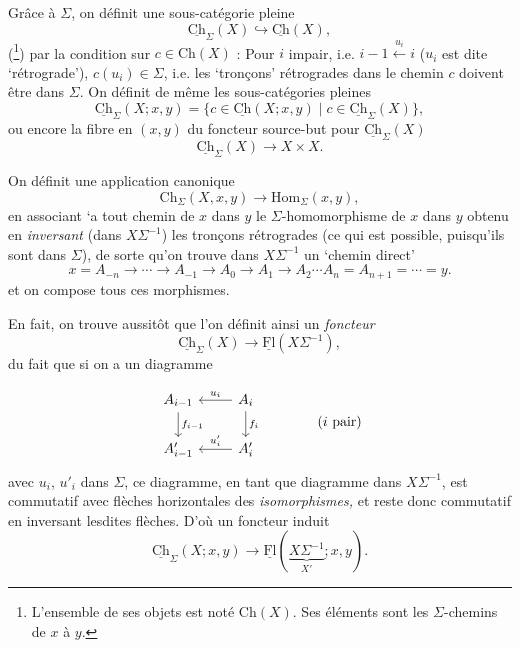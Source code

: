 \documentclass[11pt]{article}
\newcommand{\printedpage}[1]{\marginpar{\footnotesize p.~#1}}
\newcommand{\msp}[1]{\marginpar{\footnotesize [#1]}}
\newcommand{\uCh}{\underline{\mathrm{Ch}}}
\newcommand{\uFl}{\underline{\mathrm{Fl}}}
\newcommand{\Hom}{\mathrm{Hom}}
\begin{document}
Grâce à $\Sigma$, on définit une sous-catégorie pleine
\[
\uCh_\Sigma(X)\hookrightarrow\uCh(X),
\]
(\footnote[3]{L'ensemble de ses objets est noté $\mathrm{Ch}(X)$. Ses éléments sont les $\Sigma$-chemins de $x$ à $y$.}) par la condition sur $c\in\mathrm{Ch}(X)$ : Pour $i$ impair, i.e. $i-1\xleftarrow{u_i}i$ ($u_i$ est dite `rétrograde'), $c(u_i)\in\Sigma$, i.e. les `tronçons' rétrogrades dans le chemin $c$ doivent être dans $\Sigma$. On définit de même les sous-catégories pleines
\[
\uCh_\Sigma(X;x,y)=\{c\in\uCh(X;x,y)\mid c\in\uCh_\Sigma(X)\},
\]
ou encore la fibre en $(x,y)$ du foncteur source-but pour $\uCh_\Sigma(X)$
\[
\uCh_\Sigma(X)\longrightarrow X\times X.
\]

On définit une application canonique
\[
\mathrm{Ch}_\Sigma(X,x,y)\longrightarrow\Hom_\Sigma(x,y),
\]
\msp{page 7}
en associant `a tout chemin de $x$ dans $y$ le $\Sigma$-homomorphisme de $x$ dans $y$ obtenu en \textit{inversant} (dans $X\Sigma^{-1}$) les tronçons rétrogrades (ce qui est possible, puisqu'ils sont dans $\Sigma$), de sorte qu'on trouve dans $X\Sigma^{-1}$ un `chemin direct' %
\[
x=A_{-n}\longrightarrow\cdots\longrightarrow A_{-1}\longrightarrow A_0\longrightarrow A_1\longrightarrow A_2\cdots A_n=A_{n+1}=\cdots=y.
\]
et on compose tous ces morphismes.

En fait, on trouve aussitôt que l'on définit ainsi un \textit{foncteur}
\[
\uCh_\Sigma(X)\longrightarrow\uFl(X\Sigma^{-1}),
\]
 du fait que si on a un diagramme

\printedpage{6}
\[
\begin{tikzcd}
A_{i-1} \arrow[d, "f_{i-1}"] & A_i \arrow[l, "u_i"'] \arrow[d, "f_i"] \\
A'_{i-1} & A'_i \arrow[l, "u'_i"']
\end{tikzcd}
\qquad\qquad (i\text{ pair})
\]
avec $u_i$, $u'_i$ dans $\Sigma$, ce diagramme, en tant que diagramme dans $X\Sigma^{-1}$, est commutatif avec flèches horizontales des \textit{isomorphismes,} et reste donc commutatif en inversant lesdites flèches. D'où un foncteur induit
\[
\uCh_\Sigma(X;x,y)\longrightarrow\uFl(\underbrace{X\Sigma^{-1}}_{X'};x,y).
\]
\end{document}
